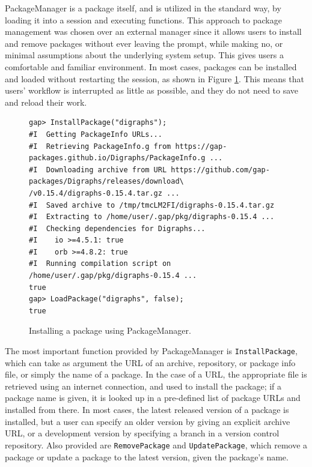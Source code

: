 {\sf PackageManager} is a \GAP package itself, and is utilized in the
standard way, by loading it into a \GAP session and executing \GAP
functions. This approach to package management was chosen over an external
manager since it allows users to install and remove packages without ever
leaving the \GAP prompt, while making no, or minimal assumptions about
the underlying system setup. This gives
users a comfortable and familiar environment. In most cases, packages can be installed
and loaded without restarting the session, as shown in Figure \ref{fig:pkgman-sample-b}.
This means that users' workflow is interrupted as little as possible, and they do
not need to save and reload their work.

\begin{figure}[!ht]
  \begin{mdframed}
    \centering
    {\tiny
\begin{verbatim}
gap> InstallPackage("digraphs");
#I  Getting PackageInfo URLs...
#I  Retrieving PackageInfo.g from https://gap-packages.github.io/Digraphs/PackageInfo.g ...
#I  Downloading archive from URL https://github.com/gap-packages/Digraphs/releases/download\
/v0.15.4/digraphs-0.15.4.tar.gz ...
#I  Saved archive to /tmp/tmcLM2FI/digraphs-0.15.4.tar.gz
#I  Extracting to /home/user/.gap/pkg/digraphs-0.15.4 ...
#I  Checking dependencies for Digraphs...
#I    io >=4.5.1: true
#I    orb >=4.8.2: true
#I  Running compilation script on /home/user/.gap/pkg/digraphs-0.15.4 ...
true
gap> LoadPackage("digraphs", false);
true
\end{verbatim}
    }
    \end{mdframed}
    \caption{Installing a package using {\sf PackageManager}.}
    \label{fig:pkgman-sample-b}
\end{figure}

The most important function provided by {\sf PackageManager} is
\texttt{InstallPackage}, which can take as argument the URL of an archive, repository, or package info file, or simply the
name of a package.  In the case of a URL, the appropriate file is retrieved
using an internet connection, and used to install the package; if a package name
is given, it is looked up in a pre-defined list of package URLs and installed
from there.  In most cases, the latest released version of a package is
installed, but a user can specify an older version by giving an explicit archive
URL, or a development version by specifying a branch in a
version control repository.
Also provided are \texttt{RemovePackage} and \texttt{UpdatePackage}, which
remove a package or update a package to the latest version, given the package's
name.

